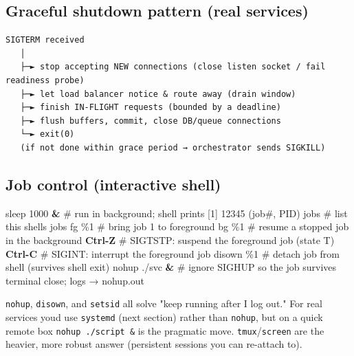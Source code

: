 \documentclass[11pt]{article}
\newenvironment{Shaded}{\begin{snugshade}}{\end{snugshade}}
\newcommand{\BuiltInTok}[1]{\textcolor[rgb]{0.50,0.55,0.55}{#1}}
\newcommand{\CommentTok}[1]{\textcolor[rgb]{0.48,0.49,0.49}{#1}}
\newcommand{\ExtensionTok}[1]{\textcolor[rgb]{0.00,0.60,1.00}{\textbf{#1}}}
\newcommand{\FunctionTok}[1]{\textcolor[rgb]{0.56,0.27,0.68}{#1}}
\newcommand{\KeywordTok}[1]{\textcolor[rgb]{0.81,0.81,0.76}{\textbf{#1}}}
\newcommand{\NormalTok}[1]{\textcolor[rgb]{0.81,0.81,0.76}{#1}}
\begin{document}
\subsection{Graceful shutdown pattern (real services)}\label{graceful-shutdown-pattern-real-services}

\setcodelang{}

\begin{verbatim}
SIGTERM received
   │
   ├─► stop accepting NEW connections (close listen socket / fail readiness probe)
   ├─► let load balancer notice & route away (drain window)
   ├─► finish IN-FLIGHT requests (bounded by a deadline)
   ├─► flush buffers, commit, close DB/queue connections
   └─► exit(0)
   (if not done within grace period → orchestrator sends SIGKILL)
\end{verbatim}

\subsection{Job control (interactive shell)}\label{job-control-interactive-shell}


\begin{Shaded}
\begin{Highlighting}[]
\FunctionTok{sleep}\NormalTok{ 1000 }\KeywordTok{\&}        \CommentTok{\# run in background; shell prints [1] 12345 (job\#, PID)}
\BuiltInTok{jobs}                \CommentTok{\# list this shell\textquotesingle{}s jobs}
\BuiltInTok{fg}\NormalTok{ \%1               }\CommentTok{\# bring job 1 to foreground}
\BuiltInTok{bg}\NormalTok{ \%1               }\CommentTok{\# resume a stopped job in the background}
\ExtensionTok{Ctrl{-}Z}              \CommentTok{\# SIGTSTP: suspend the foreground job (state T)}
\ExtensionTok{Ctrl{-}C}              \CommentTok{\# SIGINT: interrupt the foreground job}
\BuiltInTok{disown}\NormalTok{ \%1           }\CommentTok{\# detach job from shell (survives shell exit)}
\FunctionTok{nohup}\NormalTok{ ./svc }\KeywordTok{\&}       \CommentTok{\# ignore SIGHUP so the job survives terminal close; logs → nohup.out}
\end{Highlighting}
\end{Shaded}

\texttt{nohup}, \texttt{disown}, and \texttt{setsid} all solve "keep running after I log out." For real services you\textquotesingle d use \texttt{systemd} (next section) rather than \texttt{nohup}, but on a quick remote box \texttt{nohup\ ./script\ \&} is the pragmatic move. \texttt{tmux}/\texttt{screen} are the heavier, more robust answer (persistent sessions you can re-attach to).
\end{document}
